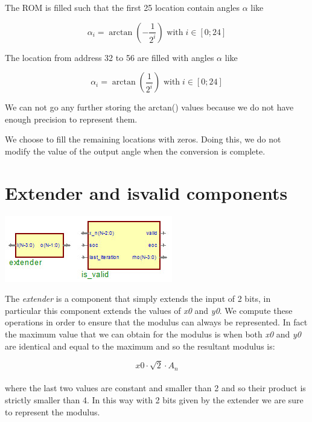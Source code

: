 \documentclass[12pt,a4paper]{report}
\begin{document}
The ROM is filled such that the first 25 location contain angles $\alpha$ like

\begin{equation}
\alpha_{i} = \arctan \left( - \dfrac{1}{2^{i}} \right) \mbox{ with} \; i \in \left[0; 24 \right]
\end{equation}

The location from address 32 to 56 are filled with angles $\alpha$ like

\begin{equation}
\alpha_{i} = \arctan \left(\dfrac{1}{2^{i}} \right) \mbox{ with} \; i \in \left[0; 24 \right]
\end{equation}

We can not go any further storing the arctan() values because we do not have enough precision to represent them.

We choose to fill the remaining locations with zeros. Doing this, we do not modify the value of the output angle when the conversion is complete.

\section{Extender and is\textunderscore valid components}
\begin{center}
\includegraphics{img/isvalid.jpg}\\
\end{center}
The \emph{extender} is a component that simply extends the input of 2 bits, in particular this component extends the values of \emph{x0} and \emph{y0}. We compute these operations in order to ensure that the modulus can always be represented. In fact the maximum value that we can obtain for the modulus is when both \emph{x0} and \emph{y0} are identical and equal to the maximum and so the resultant modulus is:

		\begin{equation}
		x0 \cdot \sqrt{2} \cdot A_{n}
		\end{equation}
	\\	
where the last two values are constant and smaller than 2 and so their product is strictly smaller than 4. In this way with 2 bits given by the extender we are sure to represent the modulus. 
\end{document}
